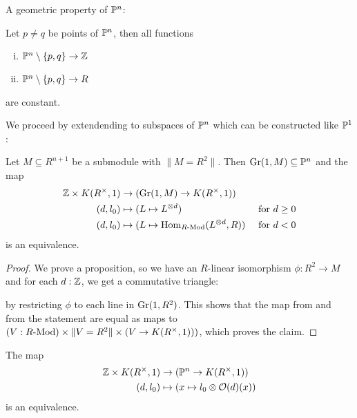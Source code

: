 A geometric property of $\mathbb{P}^n$:

\begin{lemma}\label{constant-functions-Pn-minus-points}
  Let $p\neq q$ be points of $\mathbb{P}^n$, then all functions
  \begin{center}
  \begin{enumerate}[(i)]
  \item $\mathbb{P}^n\setminus\{p,q\}\to \mathbb{Z}$
  \item $\mathbb{P}^n\setminus\{p,q\}\to R$
  \end{enumerate}
  \end{center}
  are constant.
\end{lemma}

We proceed by extendending  to subspaces of $\mathbb{P}^n$ which can be constructed like $\mathbb{P}^1$:

\begin{lemma}\label{line-bundle-on-line}
  Let $M\subseteq R^{n+1}$ be a submodule with $\|M=R^2\|$.
  Then $\mathrm{Gr}(1,M)\subseteq \mathbb{P}^n$ and the map
  \begin{align*}
    \mathbb{Z}\times K(R^{\times},1) &\to (\mathrm{Gr}(1,M)\to K(R^{\times},1)) &\\
    (d,l_0) &\mapsto (L\mapsto L^{\otimes d}) &\text{ for $d\geq 0$} \\
    (d,l_0) &\mapsto (L\mapsto \mathrm{Hom}_{R\text{-}\mathrm{Mod}}(L^{\otimes d},R)) &\text{ for $d< 0$} 
  \end{align*}
  is an equivalence.
\end{lemma}

\begin{proof}
  We prove a proposition, so we have an $R$-linear isomorphism $\phi:R^2\to M$ and for each $d:\mathbb{Z}$, we get a commutative triangle:
  \begin{center}
\end{center}
by restricting $\phi$ to each line in $\mathrm{Gr}(1,R^2)$.
This shows that the map from  and from the statement are equal as maps to $(V:R\text{-}\mathrm{Mod})\times \|V=R^2\| \times (V\to K(R^{\times},1)))$,
which proves the claim.
\end{proof}

\begin{theorem}
  The map
  \begin{align*}
    \mathbb{Z}\times K(R^{\times},1) &\to (\mathbb{P}^n\to K(R^{\times},1)) \\
    (d,l_0) &\mapsto (x\mapsto l_0\otimes \mathcal{O}(d)(x))
  \end{align*}
  is an equivalence.
\end{theorem}

